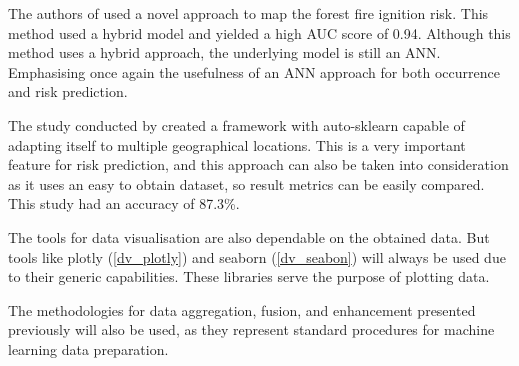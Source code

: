 The authors of \cite{TIENBUI2018104} used a novel approach to map the forest fire ignition risk. This method used a hybrid model and yielded a high AUC score of 0.94. Although this method uses a hybrid approach, the underlying model is still an ANN. Emphasising once again the usefulness of an ANN approach for both occurrence and risk prediction.


The study conducted by \cite{Qu_2020} created a framework with auto-sklearn capable of adapting itself to multiple geographical locations. This is a very important feature for risk prediction, and this approach can also be taken into consideration as it uses an easy to obtain dataset, so result metrics can be easily compared. This study had an accuracy of 87.3\%.


The tools for data visualisation are also dependable on the obtained data. But tools like plotly (\ref{dv_plotly}) and seaborn (\ref{dv_seabon}) will always be used due to their generic capabilities. These libraries serve the purpose of plotting data.


The methodologies for data aggregation, fusion, and enhancement presented previously will also be used, as they represent standard procedures for machine learning data preparation.



\cleardoublepage

\glsresetall



